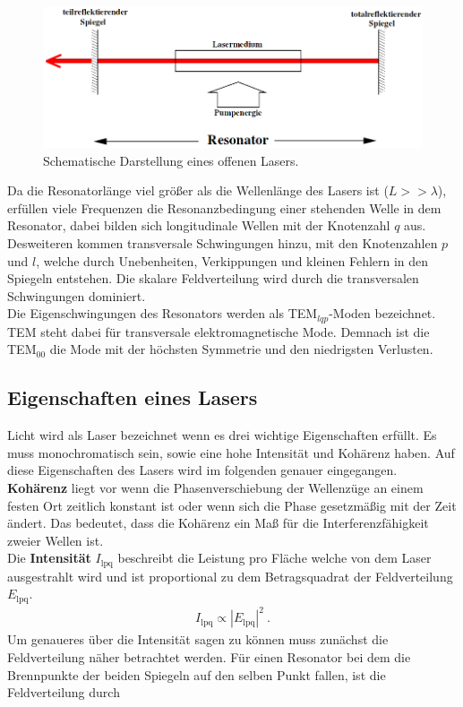 \begin{figure}[H]
	\includegraphics[width=\linewidth]{Bilder/Resonator.png}
	\caption{Schematische Darstellung eines offenen Lasers. \cite{V61}}
	\label{fig:Laser}
\end{figure}

Da die Resonatorlänge viel größer als die Wellenlänge des Lasers ist ($L >> \lambda$), erfüllen viele Frequenzen die Resonanzbedingung einer stehenden Welle in dem Resonator, dabei bilden sich longitudinale Wellen mit der Knotenzahl $q$ aus. Desweiteren kommen transversale Schwingungen hinzu, mit den Knotenzahlen $p$ und $l$, welche durch Unebenheiten, Verkippungen und kleinen Fehlern in den Spiegeln entstehen. Die skalare Feldverteilung wird durch die transversalen Schwingungen dominiert. \\
Die Eigenschwingungen des Resonators werden als TEM$_{lqp}$-Moden bezeichnet. TEM steht dabei für transversale elektromagnetische Mode. Demnach ist die TEM$_{00}$ die Mode mit der höchsten Symmetrie und den niedrigsten Verlusten.

\subsection{Eigenschaften eines Lasers}
Licht wird als Laser bezeichnet wenn es drei wichtige Eigenschaften erfüllt. Es muss monochromatisch sein, sowie eine hohe Intensität und Kohärenz haben. Auf diese Eigenschaften des Lasers wird im folgenden genauer eingegangen. \\
\textbf{Kohärenz} liegt vor wenn die Phasenverschiebung der Wellenzüge an einem festen Ort zeitlich konstant ist oder wenn sich die Phase gesetzmäßig mit der Zeit ändert.
Das bedeutet, dass die Kohärenz ein Maß für die Interferenzfähigkeit zweier Wellen ist. \\
Die \textbf{Intensität} $I_\text{lpq}$ beschreibt die Leistung pro Fläche welche von dem Laser ausgestrahlt wird und ist proportional zu dem Betragsquadrat der Feldverteilung $E_\text{lpq}$.
\begin{align*}
	I_\text{lpq} \propto |E_\text{lpq}|^2 \ .
\end{align*}
Um genaueres über die Intensität sagen zu können muss zunächst die Feldverteilung näher betrachtet werden. Für einen Resonator bei dem die Brennpunkte der beiden Spiegeln auf den selben Punkt fallen, ist die Feldverteilung durch

